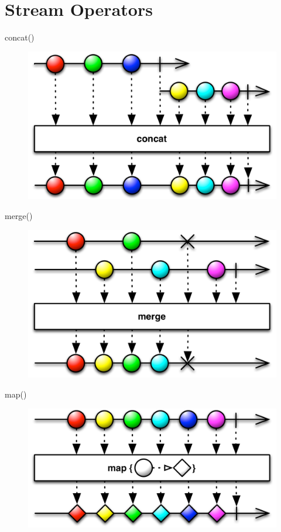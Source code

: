 \section{Stream Operators}\label{sec:rxjava}
\begin{frame}{concat()}
	\begin{figure}[h]
		\includegraphics[width=1.0\textwidth,page=1]{gfx/concat}
	\end{figure}
\end{frame}

\begin{frame}{merge()}
	\begin{figure}[h]
		\includegraphics[width=1.0\textwidth,page=1]{gfx/merge}
	\end{figure}
\end{frame}

\begin{frame}{map()}
	\begin{figure}[h]
		\includegraphics[width=1.0\textwidth,page=1]{gfx/map}
	\end{figure}
\end{frame}

